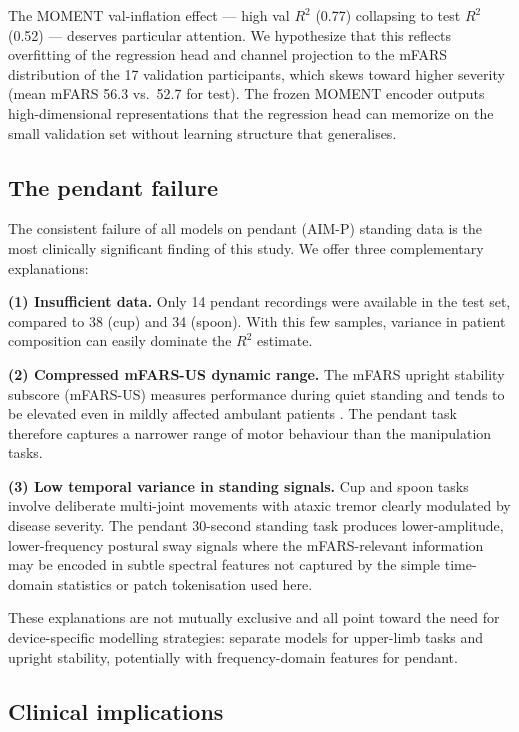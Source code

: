 \documentclass[10pt,twocolumn]{IEEEtran}
\begin{document}
The MOMENT val-inflation effect --- high val $R^2$ (0.77) collapsing
to test $R^2$ (0.52) --- deserves particular attention.
We hypothesize that this reflects overfitting of the regression
head and channel projection to the mFARS distribution of the
17 validation participants, which skews toward higher severity
(mean mFARS 56.3 vs.\ 52.7 for test). The frozen MOMENT encoder
outputs high-dimensional representations that the regression head
can memorize on the small validation set without learning
structure that generalises.

\subsection{The pendant failure}

The consistent failure of all models on pendant (AIM-P) standing data
is the most clinically significant finding of this study.
We offer three complementary explanations:

\textbf{(1) Insufficient data.} Only 14 pendant recordings were
available in the test set, compared to 38 (cup) and 34 (spoon).
With this few samples, variance in patient composition can easily
dominate the $R^2$ estimate.

\textbf{(2) Compressed mFARS-US dynamic range.} The mFARS upright
stability subscore (mFARS-US) measures performance during quiet
standing and tends to be elevated even in mildly affected ambulant
patients \cite{Lynch2006,Iyer2022}. The pendant task therefore
captures a narrower range of motor behaviour than the
manipulation tasks.

\textbf{(3) Low temporal variance in standing signals.} Cup and spoon
tasks involve deliberate multi-joint movements with ataxic tremor
clearly modulated by disease severity. The pendant 30-second
standing task produces lower-amplitude, lower-frequency postural
sway signals where the mFARS-relevant information may be
encoded in subtle spectral features not captured by the simple
time-domain statistics or patch tokenisation used here.

These explanations are not mutually exclusive and all point toward
the need for device-specific modelling strategies: separate models
for upper-limb tasks and upright stability, potentially with
frequency-domain features for pendant.

\subsection{Clinical implications}
\end{document}

